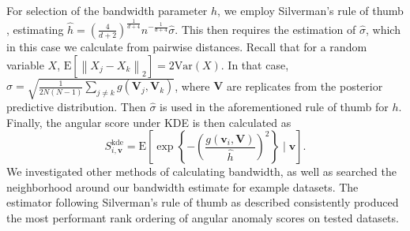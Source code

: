 For selection of the bandwidth parameter $h$, we employ Silverman's rule of
    thumb \citep{silverman2018}, estimating 
    $\hat{h} = \left(\frac{4}{d+2}\right)^{\frac{1}{d+4}}
        n^{-\frac{1}{d+4}}\hat{\sigma}$.
    This then requires the estimation of $\hat{\sigma}$, which in this case we
    calculate from pairwise distances.  Recall that for a random variable $X$,
    $\text{E}\left[\left\lVert X_j - X_k\right\rVert_2\right] 
        = 2\text{Var}(X)$.
    In that case, $\hat{\sigma} = 
        \sqrt{\frac{1}{2N(N-1)}\sum_{j\neq k}g(\bm{V}_j,\bm{V}_k)}$, where
    $\bm{V}$ are replicates from the posterior predictive distribution.
    Then $\hat{\sigma}$ is used in the aforementioned rule of thumb for $h$.
    Finally, the angular score under KDE is then calculated as
    \begin{equation}
    \label{eqn:ad_kde_h}
    S_{i,\bm{v}}^{\text{kde}} = \text{E}\left[\exp\left\lbrace -
    \left(\frac{g(\bm{v}_i,\bm{V})}{\hat{h}}\right)^2\right\rbrace\mid\bm{v}\right].
    \end{equation}
    We investigated other methods of calculating bandwidth, as well as searched
    the neighborhood around our bandwidth estimate for example datasets.
    The estimator following Silverman's rule of thumb as described consistently 
    produced the most performant rank ordering of angular anomaly scores on 
    tested datasets.

